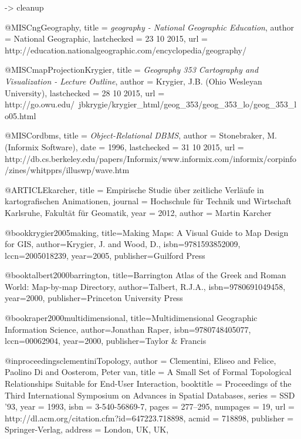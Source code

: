 -> cleanup


@MISC{ngGeography,
  title       = {\emph{geography - National Geographic Education}},
  author      = {{National Geographic}},
  lastchecked = {23 10 2015},
  url         = {http://education.nationalgeographic.com/encyclopedia/geography/}
}

@MISC{mapProjectionKrygier,
  title       = {\emph{Geography 353 Cartography and Visualization - Lecture Outline}},
  author      = {{Krygier, J.B. (Ohio Wesleyan University)}},
  lastchecked = {28 10 2015},
  url         = {http://go.owu.edu/~jbkrygie/krygier_html/geog_353/geog_353_lo/geog_353_lo05.html}
}

@MISC{ordbms,
  title       = {\emph{Object-Relational DBMS}},
  author      = {{Stonebraker, M. (Informix Software)}},
  date        = {1996},
  lastchecked = {31 10 2015},
  url         = {http://db.cs.berkeley.edu/papers/Informix/www.informix.com/informix/corpinfo/zines/whitpprs/illuswp/wave.htm}
}

@ARTICLE{karcher,
  title = {{Empirische Studie über zeitliche Verläufe in kartografischen Animationen}},
  journal = {Hochschule für Technik und Wirtschaft Karlsruhe, Fakultät für Geomatik},
  year = {2012},
  author = {Martin Karcher}
}


@book{krygier2005making,
  title={Making Maps: A Visual Guide to Map Design for GIS},
  author={Krygier, J. and Wood, D.},
  isbn={9781593852009},
  lccn={2005018239},
  year={2005},
  publisher={Guilford Press}
}

@book{talbert2000barrington,
  title={Barrington Atlas of the Greek and Roman World: Map-by-map Directory},
  author={Talbert, R.J.A.},
  isbn={9780691049458},
  year={2000},
  publisher={Princeton University Press}
}

@book{raper2000multidimensional,
  title={Multidimensional Geographic Information Science},
  author={Jonathan Raper},
  isbn={9780748405077},
  lccn={00062904},
  year={2000},
  publisher={Taylor \& Francis}
}

@inproceedings{clementiniTopology,
 author = {Clementini, Eliseo and Felice, Paolino Di and Oosterom, Peter van},
 title = {A Small Set of Formal Topological Relationships Suitable for End-User Interaction},
 booktitle = {Proceedings of the Third International Symposium on Advances in Spatial Databases},
 series = {SSD '93},
 year = {1993},
 isbn = {3-540-56869-7},
 pages = {277--295},
 numpages = {19},
 url = {http://dl.acm.org/citation.cfm?id=647223.718898},
 acmid = {718898},
 publisher = {Springer-Verlag},
 address = {London, UK, UK},
}
